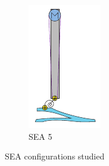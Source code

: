 \begin{figure}[hb!]
\begin{subfigure}{.19\textwidth}
    \includegraphics[width=\linewidth]{figures/illustration_serial_rotational.pdf}
    \caption{SEA 5}
    \label{fig:series5}
  \end{subfigure}
  \caption{SEA configurations studied}
\end{figure}  


